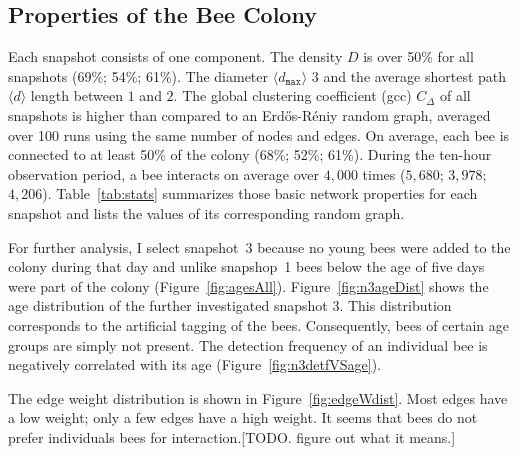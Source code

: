 \subsection{Properties of the Bee Colony}
\label{subsec:colony}
Each snapshot consists of one component.
The density $D$ is over 50\% for all snapshots (69\%; 54\%; 61\%). The diameter $\langle d_{\texttt{max}} \rangle$ $3$ and the average shortest path $\langle d \rangle$ length between $1$ and $2$. The global clustering coefficient (gcc) $C_\Delta$ of all snapshots is higher than compared to an Erd\H{o}s-R\'{e}niy random graph, averaged over 100 runs using the same number of nodes and edges. On average, each bee is connected to at least 50\% of the colony (68\%; 52\%; 61\%). During the ten-hour observation period, a bee interacts on average over $4,000$ times ($5,680$; $3,978$; $4,206$).
Table~\ref{tab:stats} summarizes those basic network properties for each snapshot and lists the values of its corresponding random graph.

For further analysis, I select snapshot~3 because no young bees were added to the colony during that day and unlike snapshop~1 bees below the age of five days were part of the colony (Figure~\ref{fig:agesAll}).
Figure~\ref{fig:n3ageDist} shows the age distribution of the further investigated snapshot 3. This distribution corresponds to the artificial tagging of the bees. Consequently, bees of certain age groups are simply not present. The detection frequency of an individual bee is negatively correlated with its age (Figure~\ref{fig:n3detfVSage}).


The edge weight distribution is shown in Figure~\ref{fig:edgeWdist}.
Most edges have a low weight; only a few edges have a high weight.
It seems that bees do not prefer individuals bees for interaction.[TODO. figure out what it means.]



